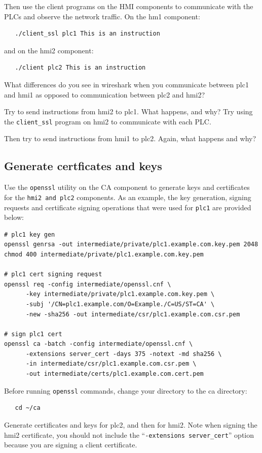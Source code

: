 Then use the client programs on the HMI components to communicate with the PLCs and observe
the network traffic.  On the hm1 component:
\begin{verbatim}
   ./client_ssl plc1 This is an instruction
\end{verbatim}

\noindent and on the hmi2 component:
\begin{verbatim}
   ./client plc2 This is an instruction
\end{verbatim}

What differences do you see in wireshark when you communicate between plc1 and hmi1 as 
opposed to communication between plc2 and hmi2?

Try to send instructions from hmi2 to plc1.  What happens, and why?
Try using the {\tt client\_ssl} program on hmi2 to communicate with each PLC.

Then try to send instructions from hmi1 to plc2.  Again, what happens and why?

\subsection{Generate certficates and keys}
Use the {\tt openssl} utility on the CA component to generate keys and certificates for the {\tt hmi2 and \tt plc2} components.
As an example, the key generation, signing requests and certificate signing operations that were
used for {\tt plc1} are provided below:
\begin{verbatim}
# plc1 key gen
openssl genrsa -out intermediate/private/plc1.example.com.key.pem 2048
chmod 400 intermediate/private/plc1.example.com.key.pem

# plc1 cert signing request
openssl req -config intermediate/openssl.cnf \
      -key intermediate/private/plc1.example.com.key.pem \
      -subj '/CN=plc1.example.com/O=Example./C=US/ST=CA' \
      -new -sha256 -out intermediate/csr/plc1.example.com.csr.pem

# sign plc1 cert
openssl ca -batch -config intermediate/openssl.cnf \
      -extensions server_cert -days 375 -notext -md sha256 \
      -in intermediate/csr/plc1.example.com.csr.pem \
      -out intermediate/certs/plc1.example.com.cert.pem
\end{verbatim}
Before running {\tt openssl} commands, change your directory to the ca directory:
\begin{verbatim}
   cd ~/ca
\end{verbatim}
Generate certificates and keys for plc2, and then for hmi2.  Note when signing 
the hmi2 certificate, you should not include the ``{\tt -extensions server\_cert}'' option
because you are signing a client certificate.

